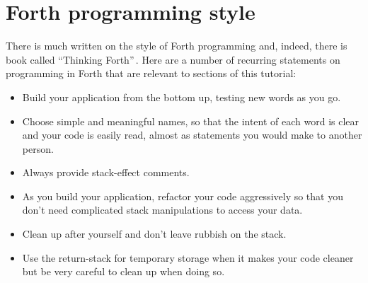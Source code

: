 \documentclass[12pt,a4paper]{article}
\begin{document}
\section{Forth programming style}
%
There is much written on the style of Forth programming and, indeed, there is book
called ``Thinking Forth''\,\cite{brodie_2004a}.
Here are a number of recurring statements on programming in Forth that are relevant
to sections of this tutorial:
\begin{itemize}
 \item Build your application from the bottom up, testing new words as you go.
 \item Choose simple and meaningful names, so that the intent of each word is clear
   and your code is easily read, almost as statements you would make to another person.
 \item Always provide stack-effect comments.
 \item As you build your application, refactor your code aggressively so that you
   don't need complicated stack manipulations to access your data.
 \item Clean up after yourself and don't leave rubbish on the stack.
 \item Use the return-stack for temporary storage when it makes your code cleaner
   but be very careful to clean up when doing so.
\end{itemize}


\newpage



\newpage
\appendix
\end{document}
